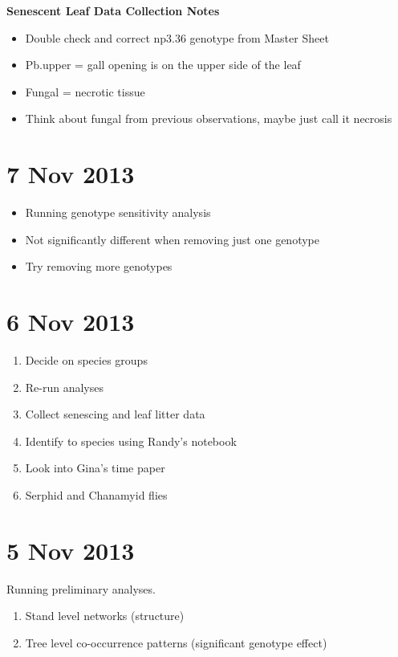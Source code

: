 \documentclass[12pt]{article}
\begin{document}
\textbf{Senescent Leaf Data Collection Notes}

\begin{itemize}
\item Double check and correct np3.36 genotype from Master Sheet
\item Pb.upper = gall opening is on the upper side of the leaf
\item Fungal = necrotic tissue
\item Think about fungal from previous observations, maybe just call
  it necrosis
\end{itemize}

\section{7 Nov 2013}

\begin{itemize}
\item Running genotype sensitivity analysis
\item Not significantly different when removing just one genotype
\item Try removing more genotypes
\end{itemize}

\section{6 Nov 2013}

\begin{enumerate}
\item Decide on species groups 
\item Re-run analyses
\item Collect senescing and leaf litter data
\item Identify to species using Randy's notebook
\item Look into Gina's time paper
\item Serphid and Chanamyid flies

\end{enumerate}

\section{5 Nov 2013}

Running preliminary analyses.
\begin{enumerate}
\item Stand level networks (structure)
\item Tree level co-occurrence patterns (significant genotype effect)
\end{enumerate}
\end{document}
